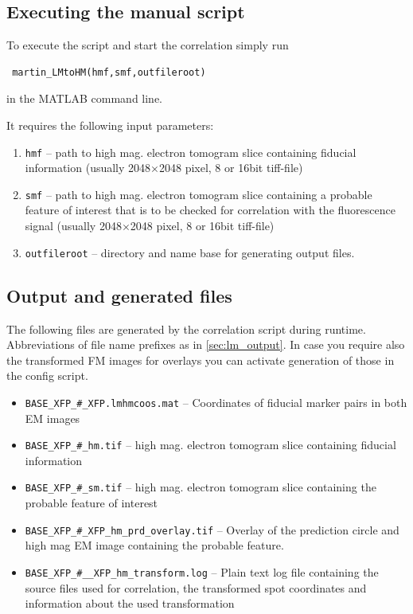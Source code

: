 \documentclass[10pt,a4paper,onepage,DIV12]{scrartcl}
\begin{document}
\subsection{Executing the manual script}
To execute the script and start the correlation simply run \begin{verbatim}
 martin_LMtoHM(hmf,smf,outfileroot)
\end{verbatim}
 in the MATLAB command line.


It requires the following input parameters:
\begin{enumerate}
 \item\texttt{hmf} -- path to high mag. electron tomogram slice containing fiducial information (usually 2048$\times$2048 pixel, 8 or 16bit tiff-file)
 \item\texttt{smf} -- path to high mag. electron tomogram slice containing a probable feature of interest that is to be checked for correlation with the fluorescence signal (usually 2048$\times$2048 pixel, 8 or 16bit tiff-file)
 \item\texttt{outfileroot} -- directory and name base for generating output files.
\end{enumerate}
\subsection{Output and generated files}
The following files are generated by the correlation script during runtime. Abbreviations of file name prefixes as in \ref{sec:lm_output}. In case you require also the transformed FM images for overlays you can activate generation of those in the config script.
\begin{itemize}
\item \texttt{BASE\_XFP\_\#\_XFP.lmhmcoos.mat} -- Coordinates of fiducial marker pairs in both EM images
% 

\item \texttt{BASE\_XFP\_\#\_hm.tif} -- high mag. electron tomogram slice containing fiducial information 
\item \texttt{BASE\_XFP\_\#\_sm.tif} -- high mag. electron tomogram slice containing the probable feature of interest 
\item \texttt{BASE\_XFP\_\#\_XFP\_hm\_prd\_overlay.tif} -- Overlay of the prediction circle and high mag EM image containing the probable feature.


\item \texttt{BASE\_XFP\_\#\_\_XFP\_hm\_transform.log} -- Plain text log file containing the source files used for correlation, the transformed spot coordinates and information about the used transformation
\end{itemize}
\newpage
\end{document}
